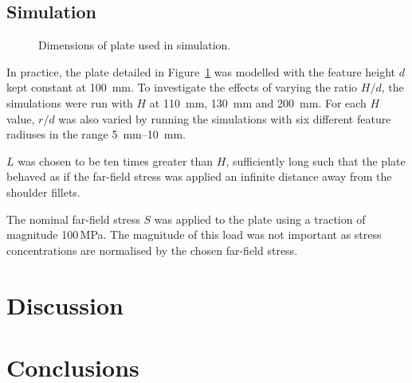 \documentclass[a4paper,11pt,twocolumn]{article}
\begin{document}
\subsection{Simulation}

\begin{figure}[h]
    \def\svgwidth{0.48\textwidth}
    
    \caption{Dimensions of plate used in simulation.}
    \label{fig:simulation_dims}
\end{figure}

In practice, the plate detailed in Figure~\ref{fig:simulation_dims} was modelled
with the feature height $d$ kept constant at 100~\si{\milli\meter}. To
investigate the effects of varying the ratio $H/d$, the simulations were run
with $H$ at 110~\si{\milli\meter}, 130~\si{\milli\meter} and 200~\si
{\milli\meter}. For each $H$ value, $r/d$ was also varied by running the
simulations with six different feature radiuses in the range
5~\si{\milli\meter}--10~\si{\milli\meter}.

$L$ was chosen to be ten times greater than $H$, sufficiently long such that the
plate behaved as if the far-field stress was applied an infinite distance away
from the shoulder fillets.

The nominal far-field stress $S$ was applied to the plate using a traction of
magnitude 100\,\si{\mega\pascal}. The magnitude of this load was not important
as stress concentrations are normalised by the chosen far-field stress.

\section{Discussion}
\section{Conclusions}

\printbibliography
\end{document}
